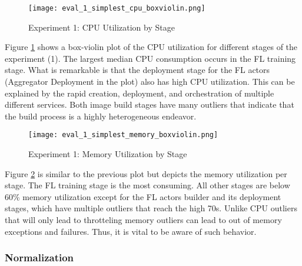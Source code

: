 \begin{figure}[p]
    \begin{adjustwidth}{-0.2\paperwidth}{-0.2\paperwidth}
        \centering
        \texttt{[image: eval\_1\_simplest\_cpu\_boxviolin.png]}
        \caption{Experiment 1: CPU Utilization by Stage}
        \label{fig:eval_1_simplest_cpu_boxviolin}
    \end{adjustwidth}
\end{figure}

Figure \ref{fig:eval_1_simplest_cpu_boxviolin} shows a box-violin plot of the CPU utilization for different stages of the experiment (1).
The largest median CPU consumption occurs in the FL training stage.
What is remarkable is that the deployment stage for the FL actors (Aggregator Deployment in the plot) also has high CPU utilization.
This can be explained by the rapid creation, deployment, and orchestration of multiple different services.
Both image build stages have many outliers that indicate that the build process is a highly heterogeneous endeavor.

\begin{figure}[p]
    \begin{adjustwidth}{-0.2\paperwidth}{-0.2\paperwidth}
        \centering
        \texttt{[image: eval\_1\_simplest\_memory\_boxviolin.png]}
        \caption{Experiment 1: Memory Utilization by Stage}
        \label{fig:eval_1_simplest_memory_boxviolin}
    \end{adjustwidth}
\end{figure}

Figure \ref{fig:eval_1_simplest_memory_boxviolin} is similar to the previous plot but depicts the memory utilization per stage.
The FL training stage is the most consuming.
All other stages are below 60\% memory utilization except for the FL actors builder and its deployment stages, which have multiple outliers that reach the high 70s.
Unlike CPU outliers that will only lead to throtteling memory outliers can lead to out of memory exceptions and failures.
Thus, it is vital to be aware of such behavior.

\subsubsection{Normalization}

